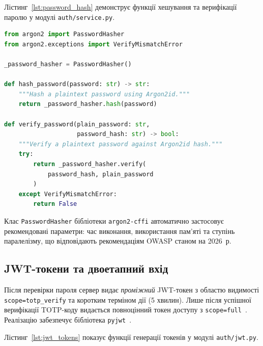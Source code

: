 Лістинг~\ref{lst:password_hash} демонструє функції хешування та верифікації
паролю у модулі \texttt{auth/service.py}.

\begin{lstlisting}[style=mystyle, language=Python,
  caption={Хешування та верифікація паролю (Argon2id)},
  label={lst:password_hash}]
from argon2 import PasswordHasher
from argon2.exceptions import VerifyMismatchError

_password_hasher = PasswordHasher()

def hash_password(password: str) -> str:
    """Hash a plaintext password using Argon2id."""
    return _password_hasher.hash(password)

def verify_password(plain_password: str,
                    password_hash: str) -> bool:
    """Verify a plaintext password against Argon2id hash."""
    try:
        return _password_hasher.verify(
            password_hash, plain_password
        )
    except VerifyMismatchError:
        return False
\end{lstlisting}

Клас \texttt{PasswordHasher} бібліотеки \texttt{argon2-cffi} автоматично
застосовує рекомендовані параметри: час виконання, використання пам'яті та
ступінь паралелізму, що відповідають рекомендаціям OWASP станом на 2026~р.

\subsection{JWT-токени та двоетапний вхід}

Після перевірки пароля сервер видає \textit{проміжний} JWT-токен з областю
видимості \texttt{scope=totp\_verify} та коротким терміном дії (5 хвилин).
Лише після успішної верифікації TOTP-коду видається повноцінний токен доступу
з \texttt{scope=full}~\cite{rfc7519, rfc9068}. Реалізацію забезпечує бібліотека
\texttt{pyjwt}~\cite{pyjwt2024}.

Лістинг~\ref{lst:jwt_tokens} показує функції генерації токенів у модулі
\texttt{auth/jwt.py}.

